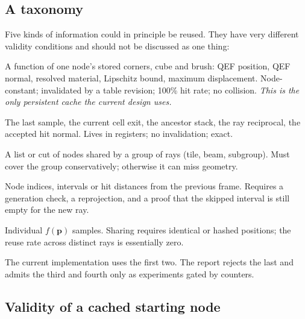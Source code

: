 \documentclass[11pt,a4paper]{article}
\newcommand{\vect}[1]{\mathbf{#1}}
\theoremstyle{plain}
\theoremstyle{definition}
\theoremstyle{remark}
\begin{document}
\subsection{A taxonomy}

Five kinds of information could in principle be reused. They have very
different validity conditions and should not be discussed as one thing:

\begin{description}[leftmargin=1.2em,itemsep=2pt]
\item[Derived node payload.] A function of one node's stored corners, cube and
  brush: QEF position, QEF normal, resolved material, Lipschitz bound, maximum
  displacement. Node-constant; invalidated by a table revision; 100\% hit rate;
  no collision. \emph{This is the only persistent cache the current design
  uses.}
\item[Intra-ray state.] The last sample, the current cell exit, the ancestor
  stack, the ray reciprocal, the accepted hit normal. Lives in registers; no
  invalidation; exact.
\item[Inter-ray spatial structure.] A list or cut of nodes shared by a group of
  rays (tile, beam, subgroup). Must cover the group conservatively; otherwise
  it can miss geometry.
\item[Inter-frame history.] Node indices, intervals or hit distances from the
  previous frame. Requires a generation check, a reprojection, and a proof
  that the skipped interval is still empty for the new ray.
\item[SDF values.] Individual $f(\vect{p})$ samples. Sharing requires identical
  or hashed positions; the reuse rate across distinct rays is essentially
  zero.
\end{description}

The current implementation uses the first two. The report rejects the last and
admits the third and fourth only as experiments gated by counters.

\subsection{Validity of a cached starting node}
\end{document}
